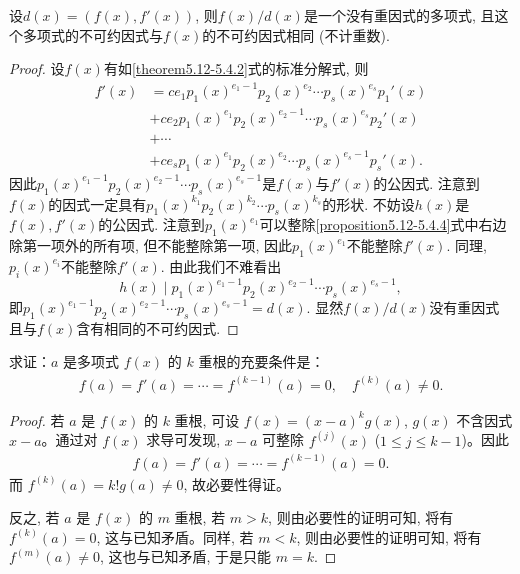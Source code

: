 \documentclass[../../main.tex]{subfiles}
\begin{document}
\begin{theorem}\label{theorem:多项式除去与其导数的最大公因式就能消去重因式}
设\(d(x)=(f(x),f'(x))\), 则\(f(x)/d(x)\)是一个没有重因式的多项式, 且这个多项式的不可约因式与\(f(x)\)的不可约因式相同 (不计重数).
\end{theorem}
\begin{proof}
设\(f(x)\)有如\eqref{theorem5.12-5.4.2}式的标准分解式, 则
\begin{align*}
f'(x)&=ce_1p_1(x)^{e_1 - 1}p_2(x)^{e_2}\cdots p_s(x)^{e_s}p_1'(x)\\
&+ce_2p_1(x)^{e_1}p_2(x)^{e_2 - 1}\cdots p_s(x)^{e_s}p_2'(x)\\
&+\cdots\\
&+ce_sp_1(x)^{e_1}p_2(x)^{e_2}\cdots p_s(x)^{e_s - 1}p_s'(x).\label{proposition5.12-5.4.4}
\end{align*}
因此\(p_1(x)^{e_1 - 1}p_2(x)^{e_2 - 1}\cdots p_s(x)^{e_s - 1}\)是\(f(x)\)与\(f'(x)\)的公因式. 注意到\(f(x)\)的因式一定具有\(p_1(x)^{k_1}p_2(x)^{k_2}\cdots p_s(x)^{k_s}\)的形状. 不妨设\(h(x)\)是\(f(x),f'(x)\)的公因式. 注意到\(p_1(x)^{e_1}\)可以整除\eqref{proposition5.12-5.4.4}式中右边除第一项外的所有项, 但不能整除第一项, 因此\(p_1(x)^{e_1}\)不能整除\(f'(x)\). 同理, \(p_i(x)^{e_i}\)不能整除\(f'(x)\). 由此我们不难看出
\[
h(x)\mid p_1(x)^{e_1 - 1}p_2(x)^{e_2 - 1}\cdots p_s(x)^{e_s - 1},
\]
即\(p_1(x)^{e_1 - 1}p_2(x)^{e_2 - 1}\cdots p_s(x)^{e_s - 1}=d(x)\). 显然\(f(x)/d(x)\)没有重因式且与\(f(x)\)含有相同的不可约因式.
\end{proof}

\begin{proposition}[多项式有k重根的充要条件]\label{proposition:多项式有k重根的充要条件}
求证：$a$ 是多项式 $f(x)$ 的 $k$ 重根的充要条件是：
\begin{align*}
f(a) = f'(a) = \cdots = f^{(k-1)}(a) = 0, \quad f^{(k)}(a) \neq 0.
\end{align*}
\end{proposition}
\begin{proof}
若 $a$ 是 $f(x)$ 的 $k$ 重根, 可设 $f(x) = (x - a)^k g(x)$, $g(x)$ 不含因式 $x - a$。通过对 $f(x)$ 求导可发现, $x - a$ 可整除 $f^{(j)}(x)$ ($1 \leq j \leq k - 1$)。因此
\begin{align*}
f(a) = f'(a) = \cdots = f^{(k-1)}(a) = 0.
\end{align*}
而 $f^{(k)}(a) = k! g(a) \neq 0$, 故必要性得证。

反之, 若 $a$ 是 $f(x)$ 的 $m$ 重根, 若 $m > k$, 则由必要性的证明可知, 将有 $f^{(k)}(a) = 0$, 这与已知矛盾。同样, 若 $m < k$, 则由必要性的证明可知, 将有 $f^{(m)}(a) \neq 0$, 这也与已知矛盾, 于是只能 $m = k$.
\end{proof}
\end{document}
